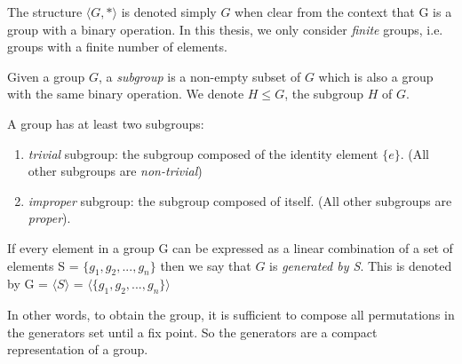 The structure $\langle G, * \rangle$ is denoted simply $G$ when clear from the context that G is a group
with a binary operation. In this thesis, we only consider \emph{finite} groups, i.e. groups with a finite number of elements.
\clearpage
\begin{definition}[Subgroup]
Given a group $G$, a \emph{subgroup} is a non-empty subset of $G$ which is also a group with 
the same binary operation. We denote $H \leq G$, the subgroup $H$ of $G$.
\end{definition}
A group has at least two subgroups: 
\begin{enumerate}[topsep=0pt,nolistsep]
 \item \emph{trivial} subgroup: the subgroup composed of the identity element $\{e\}$. (All other subgroups are \textit{non-trivial})
 \item \emph{improper} subgroup: the subgroup composed of itself. (All other subgroups are \emph{proper}).
\end{enumerate}
\begin{definition}
 If every element in a group G can be expressed as a linear combination
 of a set of elements S = $\{g_1, g_2, ..., g_n \}$ then we say that $G$ is 
 \textit{generated by S}. This is denoted by G = $\langle S \rangle$ =
 $\langle \{g_1, g_2, ..., g_n \} \rangle$ 
\end{definition}
In other words, to obtain the group, it is sufficient to compose all permutations in the generators set until a fix point.
So the generators are a compact representation of a group.
